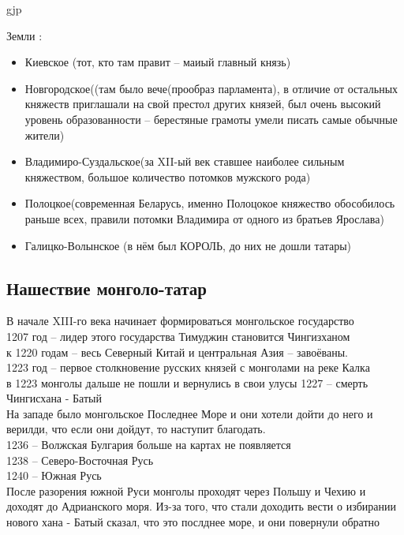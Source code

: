gjp	 \documentclass[12pt,a4paper]{article}
\begin{document}
Земли :
\begin{itemize}
 \item Киевское (тот, кто  там правит -- маиый главный князь)
 \item Новгородское((там было вече(прообраз парламента), в отличие от остальных княжеств приглашали на свой престол других князей, был очень высокий уровень образованности -- берестяные грамоты умели писать самые обычные жители)
 \item Владимиро-Суздальское(за XII-ый век ставшее наиболее сильным княжеством, большое количество потомков мужского рода)
 \item Полоцкое(современная Беларусь, именно Полоцокое княжество обособилось раньше всех, правили потомки Владимира от одного из братьев Ярослава)
 \item Галицко-Волынское (в нём был КОРОЛЬ, до них не дошли татары)
\end{itemize}
\subsection{Нашествие монголо-татар}
В начале XIII-го века начинает формироваться монгольское государство\\
1207 год -- лидер этого государства Тимуджин становится Чингизханом \\
к 1220 годам -- весь Северный Китай и центральная Азия -- завоёваны.\\
1223 год -- первое столкновение русских князей с монголами на реке Калка\\
в 1223 монголы дальше не пошли и вернулись в свои улусы
1227 -- смерть Чингисхана - Батый\\
На западе было монгольское Последнее Море и они хотели дойти до него и верилди, что если они дойдут, то наступит благодать.\\
1236 -- Волжская Булгария больше на картах не появляется\\
1238 -- Северо-Восточная Русь\\
1240 -- Южная Русь\\
После разорения южной Руси монголы проходят через Польшу и Чехию и доходят до Адрианского моря. Из-за того, что стали доходить вести о избирании нового хана - Батый сказал, что это послднее море, и они повернули обратно\\
\end{document}
